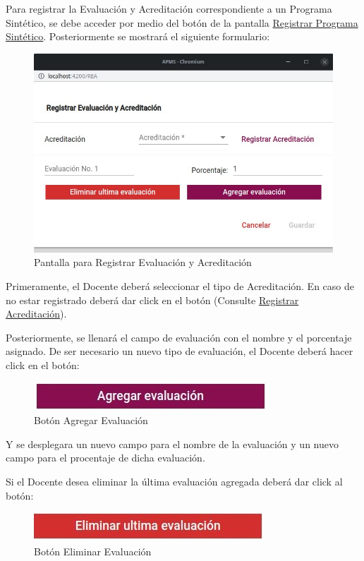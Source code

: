 Para registrar la Evaluación y Acreditación correspondiente a un Programa Sintético, se debe acceder por medio del botón  de la pantalla \hyperlink{RegistrarPS}{Registrar Programa Sintético}. Posteriormente se mostrará el siguiente formulario:


\begin{figure}[!h]
    \centering
    \hypertarget{RegistrarEC}{\includegraphics[width=0.5\linewidth]{images/SP6/8.jpeg}}
    \caption{Pantalla para Registrar Evaluación y Acreditación}
\end{figure}

Primeramente, el Docente deberá seleccionar el tipo de Acreditación. En caso de no estar registrado deberá dar click en el botón (Consulte \hyperlink{RegAcre}{Registrar Acreditación}).

Posteriormente, se llenará el campo de evaluación con el nombre y el porcentaje asignado. De ser necesario un nuevo tipo de evaluación, el Docente deberá hacer click en el botón:

\begin{figure}[!h]
    \centering
    \includegraphics[width=0.3\linewidth]{images/SP6/BotonEval.jpeg}
    \caption{Botón Agregar Evaluación}
\end{figure}

Y se desplegara un nuevo campo para el nombre de la evaluación y un nuevo campo para el procentaje de dicha evaluación.

Si el Docente desea eliminar la última evaluación agregada deberá dar click al botón:


\begin{figure}[!h]
    \centering
    \includegraphics[width=0.3\linewidth]{images/SP6/BotonEliEval.jpeg}
    \caption{Botón Eliminar Evaluación}
\end{figure}


